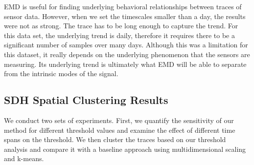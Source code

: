 EMD is useful for finding underlying behavioral relationships between traces of sensor data.  However,
when we set the timescales smaller than a day, the results were not as strong.
The trace has to be long enough to capture the trend.  For this data set, the underlying
trend is daily, therefore it requires there to be a significant number of samples over many days.
Although this was a limitation for this dataset, it really depends on the underlying phenomenon that
the sensors are measuring.  Its underlying trend is ultimately what EMD will be able to separate
from the intrinsic modes of the signal.









\subsection{SDH Spatial Clustering Results}
We conduct two sets of experiments. First, we quantify the sensitivity of our method for different threshold values 
and examine the effect of different time spans on the threshold. We then cluster the traces based on our threshold analysis 
and compare it with a baseline approach using multidimensional scaling and k-means.



